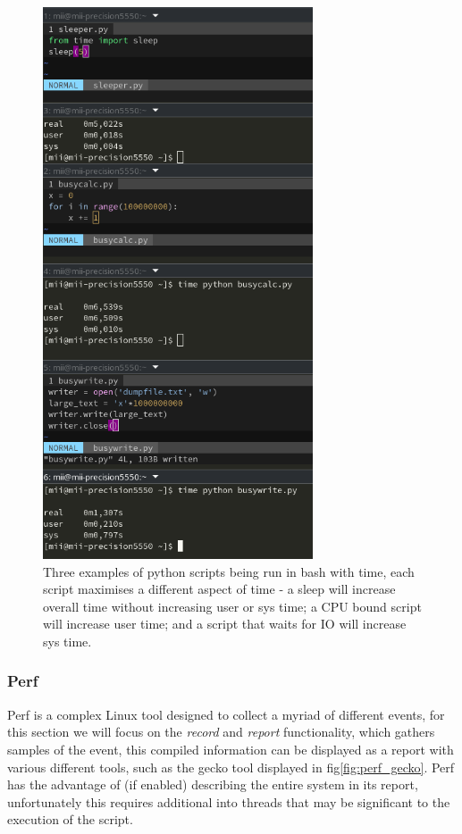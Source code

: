 \begin{figure}[H]
    \centering
    \includegraphics[width=8cm]{figures/introduction/bashtime}
    \caption{Three examples of python scripts being run in bash with time, each script maximises a different aspect of
    time - a sleep will increase overall time without increasing user or sys time; a CPU bound script will increase user
    time; and a script that waits for IO will increase sys time.}
    \label{fig:bash_time}
\end{figure}

\subsubsection{Perf}
Perf is a complex Linux tool designed to collect a myriad of different events, for this section we will focus on the
\textit{record} and \textit{report} functionality, which gathers samples of the  event, this compiled 
information can be displayed as a report with various different tools, such as the gecko tool displayed in
fig\ref{fig:perf_gecko}.
Perf has the advantage of (if enabled) describing the entire system in its report, unfortunately this requires
additional into threads that may be significant to the execution of the script.

